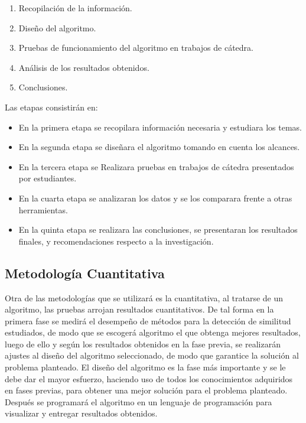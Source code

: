\begin{enumerate}
  \item Recopilación de la información.
  \item Diseño del algoritmo.
  \item Pruebas de funcionamiento del algoritmo en trabajos de cátedra.
  \item Análisis de los resultados obtenidos.
  \item Conclusiones.
\end{enumerate}

Las etapas consistirán en:

\begin{itemize}
  \item En la primera etapa se recopilara información necesaria y estudiara los temas.
  \item En la segunda etapa se diseñara el algoritmo tomando en cuenta los alcances.
  \item En la tercera etapa se Realizara pruebas en trabajos de cátedra presentados por estudiantes.
  \item En la cuarta etapa se analizaran los datos y se los comparara frente a otras herramientas.
  \item En la quinta etapa se realizara las conclusiones, se presentaran los resultados finales, y recomendaciones respecto a la investigación.
\end{itemize}
\subsection{Metodología Cuantitativa}
Otra de las metodologías que se utilizará es la cuantitativa, al tratarse de un algoritmo, las pruebas arrojan resultados cuantitativos. De tal forma en la primera fase se medirá el desempeño de métodos para la detección de similitud estudiados, de modo que se escogerá algoritmo el que obtenga mejores resultados, luego de ello y según los resultados obtenidos en la fase previa, se realizarán ajustes al diseño del algoritmo seleccionado, de modo que garantice la solución al problema planteado. El diseño del algoritmo es la fase más importante y se le debe dar el mayor esfuerzo, haciendo uso de todos los conocimientos adquiridos en fases previas, para obtener una mejor solución para el problema planteado. Después se programará el algoritmo en un lenguaje de programación para visualizar y entregar resultados obtenidos.
